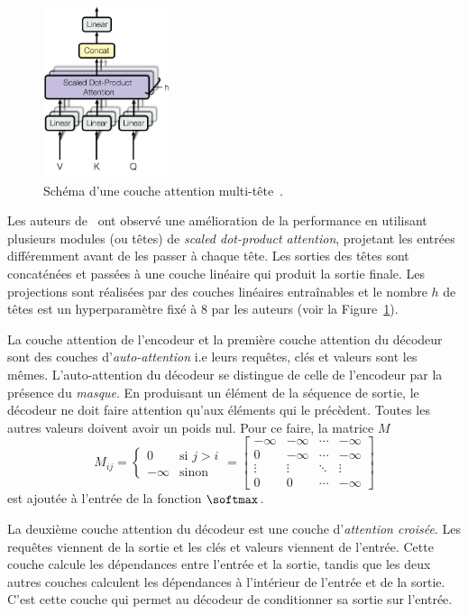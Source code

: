 \begin{figure}[hbt]
    \centering
    \includegraphics[height=5cm]{assets/images/multihead-attention.png}
    \caption[Schéma d'une couche attention multitête.]
    {Schéma d'une couche attention multi-tête~\cite[Fig 2]{attention}.}
    \label{fig.multihead-attention}
\end{figure}

Les auteurs de~\cite{attention} ont observé une amélioration de la performance 
en utilisant plusieurs modules (ou têtes) de \emph{\foreignlanguage{english}{scaled dot-product attention}},
projetant les entrées différemment avant de les passer à chaque tête.
Les sorties des têtes sont concaténées et passées à une couche linéaire qui produit la sortie finale.
Les projections sont réalisées par des couches linéaires entraînables et le nombre \(h\) de têtes est un hyperparamètre fixé à \(8\) par les auteurs (voir la Figure~\ref{fig.multihead-attention}).

La couche attention de l'encodeur et la première couche attention du décodeur sont des couches
d'\emph{auto-attention} i.e leurs requêtes, clés et valeurs sont les mêmes.
L'auto-attention du décodeur se distingue de celle de l'encodeur par la présence du \emph{masque}.
En produisant un élément de la séquence de sortie, le décodeur ne doit faire attention qu'aux éléments
qui le précèdent.
Toutes les autres valeurs doivent avoir un poids nul.
Pour ce faire, la matrice \(M\) 
\begin{equation}
    M_{ij} = \begin{cases}
        0 & \text{si } j > i \\
        -\infty & \text{sinon}
    \end{cases} 
    = \begin{bmatrix}
        -\infty & -\infty & \cdots & -\infty \\
        0       & -\infty & \cdots & -\infty \\
        \vdots  & \vdots  & \ddots & \vdots \\
        0       & 0       & \cdots & -\infty
    \end{bmatrix}
\end{equation}
est ajoutée à l'entrée de la fonction \(\softmax\).

La deuxième couche attention du décodeur est une couche d'\emph{attention croisée}.
Les requêtes viennent de la sortie et les clés et valeurs viennent de l'entrée.
Cette couche calcule les dépendances entre l'entrée et la sortie,
tandis que les deux autres couches calculent les dépendances à l'intérieur de l'entrée et de la sortie.
C'est cette couche qui permet au décodeur de conditionner sa sortie sur l'entrée.


